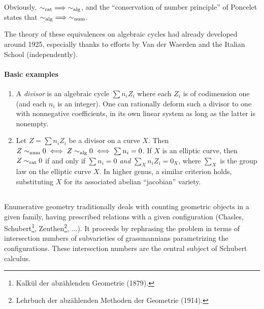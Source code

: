 \documentclass[../main.tex]{subfiles}
\begin{document}
Obviously, $\sim_{\mathrm{rat}} \implies \sim_{\mathrm{alg}}$, and the \enquote{conservation of number principle} of Poncelet states that $\sim_{\mathrm{alg}} \implies \sim_{\mathrm{num}}$.

The theory of these equivalences on algebraic cycles had already developed around 1925, especially thanks to efforts by Van der Waerden and the Italian School (independently).

\paragraph*{Basic examples}
\begin{enumerate}
    \item A \emph{divisor} is an algebraic cycle $\sum n_i Z_i$ where each $Z_i$ is of codimension one (and each $n_i$ is an integer).
    One can rationally deform such a divisor to one with nonnegative coefficients, in its own linear system as long as the latter is nonempty.

    \item Let $Z = \sum n_i Z_i$ be a divisor on a curve $X$.
    Then $Z \sim_{\mathrm{num}} 0 \iff Z \sim_{\mathrm{alg}} 0 \iff \sum n_i = 0$.
    If $X$ is an elliptic curve, then $Z \sim_{\mathrm{rat}} 0$ if and only if $\sum n_i = 0$ \emph{and} $\sum_X n_i Z_i = 0_X$, where $\sum_X$ is the group law on the elliptic curve $X$.
    In higher genus, a similar criterion holds, substituting $X$ for its associated abelian \enquote{jacobian} variety.
\end{enumerate}

\subsection{} Enumerative geometry traditionally deals with counting geometric objects in a given family, having prescribed relations with a given configuration (Chasles, Schubert\footnote{Kalkül der abzählenden Geometrie (1879).}, Zeuthen\footnote{Lehrbuch der abzählenden Methoden der Geometrie (1914).}, ...).
It proceeds by rephrasing the problem in terms of intersection numbers of subvarieties of grassmannians parametrizing the configurations. These intersection numbers are the central subject of Schubert calculus.
\end{document}
